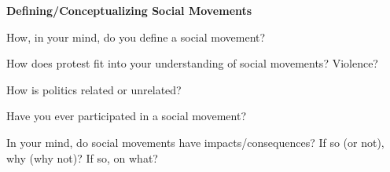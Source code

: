 \documentclass[12pt]{article}
\begin{document}
\date{}

\begin{center}
\textbf{Defining/Conceptualizing Social Movements\\}
\end{center}
\hfill\break
How, in your mind, do you define a social movement? \newline

How does protest fit into your understanding of social movements? Violence?\newline

How is politics related or unrelated? \newline

Have you ever participated in a social movement? \newline

In your mind, do social movements have impacts/consequences? If so (or not), why (why not)? If so, on what? 
\end{document}
